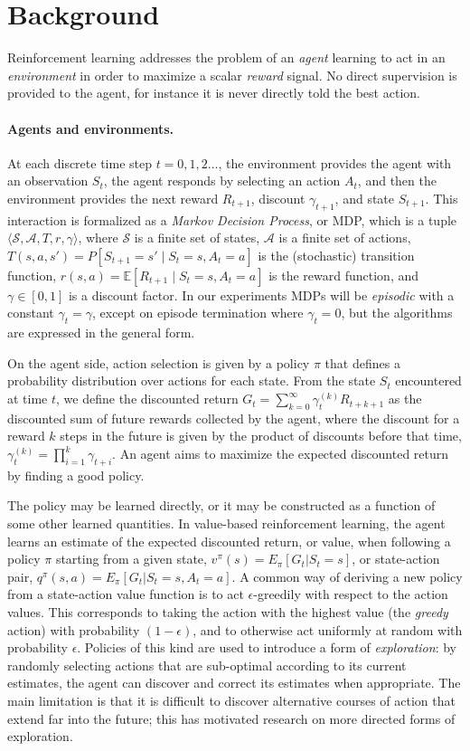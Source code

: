 \documentclass[letterpaper]{article} %
\def\S{\mathcal{S}}
\def\A{\mathcal{A}}
\def\R{r}
\begin{document}
\section{Background}
Reinforcement learning addresses the problem of an \textit{agent} learning to act in an \textit{environment} in order to maximize a scalar \textit{reward} signal. No direct supervision is provided to the agent, for instance it is never directly told the best action. 

\paragraph{Agents and environments.}
At each discrete time step $t=0, 1, 2\ldots$, the environment provides the agent with an observation $S_t$, the agent responds by selecting an action $A_t$, and then the environment provides the next reward $R_{t+1}$, discount $\gamma_{t+1}$, and state $S_{t+1}$.
This interaction is formalized as a {\em Markov Decision Process}, or MDP,  which is a tuple $\langle \S, \A, T, \R, \gamma \rangle$, where $\S$ is a finite set of states, $\A$ is a finite set of actions, $T(s, a, s') = P[S_{t+1}=s'\mid S_t=s,A_t=a]$ is the (stochastic) transition function, $\R(s,a) = \mathbb{E}[R_{t+1} \mid S_t=s, A_t=a]$ is the reward function, and $\gamma \in [0,1]$ is a discount factor. In our experiments MDPs will be \textit{episodic} with a constant $\gamma_t = \gamma$, except on episode termination where $\gamma_t=0$, but the algorithms are expressed in the general form.

On the agent side, action selection is given by a policy $\pi$ that defines a probability distribution over actions for each state. From the state $S_t$ encountered at time $t$, we define the discounted return $G_t =\sum_{k=0}^{\infty} {\gamma_t^{(k)} R_{t+k+1}}$ as the discounted sum of future rewards collected by the agent, where the discount for a reward $k$ steps in the future is given by the product of discounts before that time, $\gamma_t^{(k)} = \prod_{i=1}^{k} \gamma_{t+i}$. An agent aims to maximize the expected discounted return by finding a good policy. 

The policy may be learned directly, or it may be constructed as a function of some other learned quantities. In value-based reinforcement learning, the agent learns an estimate of the expected discounted return, or value, when following a policy $\pi$ starting from a given state, $v^\pi(s)=E_\pi[G_t| S_t =s]$, or state-action pair, $q^\pi(s,a) = E_\pi[G_t|S_t=s, A_t =a]$. A common way of deriving a new policy from a state-action value function is to act $\epsilon$-greedily with respect to the action values. This corresponds to taking the action with the highest value (the \textit{greedy} action) with probability $(1-\epsilon)$, and to otherwise act uniformly at random with probability $\epsilon$. Policies of this kind are used to introduce a form of \textit{exploration}: by randomly selecting actions that are sub-optimal according to its current estimates, the agent can discover and correct its estimates when appropriate. The main limitation is that it is difficult to discover alternative courses of action that extend far into the future; this has motivated research on more directed forms of exploration.
\end{document}
